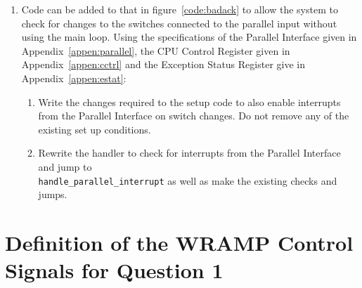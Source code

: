 \documentclass[a4paper,10pt]{article}
\begin{document}
\begin{enumerate}
\item Code can be added to that in figure~\ref{code:badack} to allow the system to check for changes to the switches connected to the parallel input without using the main loop.     Using the
specifications of the Parallel Interface given in Appendix~\ref{appen:parallel},
the CPU Control Register given in Appendix~\ref{appen:cctrl} and the Exception
Status Register give in Appendix~\ref{appen:estat}:

\begin{enumerate}

\item Write the changes required to the setup code to also enable interrupts from the Parallel Interface on switch changes.  Do not remove any of the existing set up conditions.


\item Rewrite the handler to check for interrupts from the Parallel
Interface and jump to \\
 \texttt{handle\_parallel\_interrupt} as well as make the existing checks and jumps. 


\end{enumerate}

\end{enumerate}

\newpage
\appendix
\section{Definition of the WRAMP Control Signals for Question 1} 
\label{cntrl_sig_defn}
\end{document}
